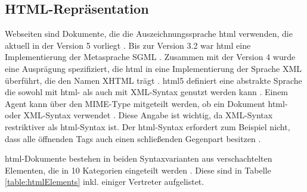         \subsection{HTML-Repräsentation}
            Webseiten sind Dokumente, die die Auszeichnungssprache \gls{html} verwenden,
            die aktuell in der Version 5 vorliegt \cite{w3c:html5}.
            Bis zur Version 3.2 war \gls{html} eine Implementierung der Metasprache SGML \cite[Kapitel 3]{w3c:html401}.
            Zusammen mit der Version 4 wurde eine Ausprägung spezifiziert,
            die \gls{html} in eine Implementierung der Sprache XML überführt,
            die den Namen XHTML trägt \cite{w3c:xhtml}.
            \gls{html}5 definiert eine abstrakte Sprache
            die sowohl mit \gls{html}- als auch mit XML-Syntax genutzt werden kann
            \cite[Kapitel 1.6]{w3c:html5}.
            Einem Agent kann über den MIME-Type mitgeteilt werden,
            ob ein Dokument \gls{html}- oder XML-Syntax verwendet \cite[Kapitel 1.6]{w3c:html5}.
            Diese Angabe ist wichtig, da XML-Syntax restriktiver als \gls{html}-Syntax ist.
            Der \gls{html}-Syntax erfordert zum Beispiel nicht,
            dass alle öffnenden Tags auch einen schließenden Gegenpart besitzen
            \cite[Kapitel 3.2.3]{w3c:html5}.

            \gls{html}-Dokumente bestehen in beiden Syntaxvarianten aus verschachtelten
            Elementen, die in 10 Kategorien eingeteilt werden \cite[Kapitel 4]{w3c:html5}.
            Diese sind in Tabelle \ref{table:htmlElements} inkl. einiger Vertreter aufgelistet.


